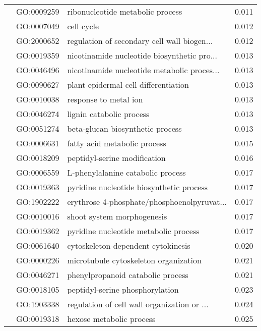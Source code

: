 \begin{longtable}{lllr}
   & GO:0009259 &             ribonucleotide metabolic process &         0.011 \\
   & GO:0007049 &                                   cell cycle &         0.012 \\
   & GO:2000652 &  regulation of secondary cell wall biogen... &         0.012 \\
   & GO:0019359 &  nicotinamide nucleotide biosynthetic pro... &         0.013 \\
   & GO:0046496 &  nicotinamide nucleotide metabolic proces... &         0.013 \\
   & GO:0090627 &         plant epidermal cell differentiation &         0.013 \\
   & GO:0010038 &                        response to metal ion &         0.013 \\
   & GO:0046274 &                     lignin catabolic process &         0.013 \\
   & GO:0051274 &             beta-glucan biosynthetic process &         0.013 \\
   & GO:0006631 &                 fatty acid metabolic process &         0.015 \\
   & GO:0018209 &                 peptidyl-serine modification &         0.016 \\
   & GO:0006559 &            L-phenylalanine catabolic process &         0.017 \\
   & GO:0019363 &     pyridine nucleotide biosynthetic process &         0.017 \\
   & GO:1902222 &  erythrose 4-phosphate/phosphoenolpyruvat... &         0.017 \\
   & GO:0010016 &                   shoot system morphogenesis &         0.017 \\
   & GO:0019362 &        pyridine nucleotide metabolic process &         0.017 \\
   & GO:0061640 &           cytoskeleton-dependent cytokinesis &         0.020 \\
   & GO:0000226 &        microtubule cytoskeleton organization &         0.021 \\
   & GO:0046271 &            phenylpropanoid catabolic process &         0.021 \\
   & GO:0018105 &              peptidyl-serine phosphorylation &         0.023 \\
   & GO:1903338 &  regulation of cell wall organization or ... &         0.024 \\
   & GO:0019318 &                     hexose metabolic process &         0.025 \\

\end{longtable}
